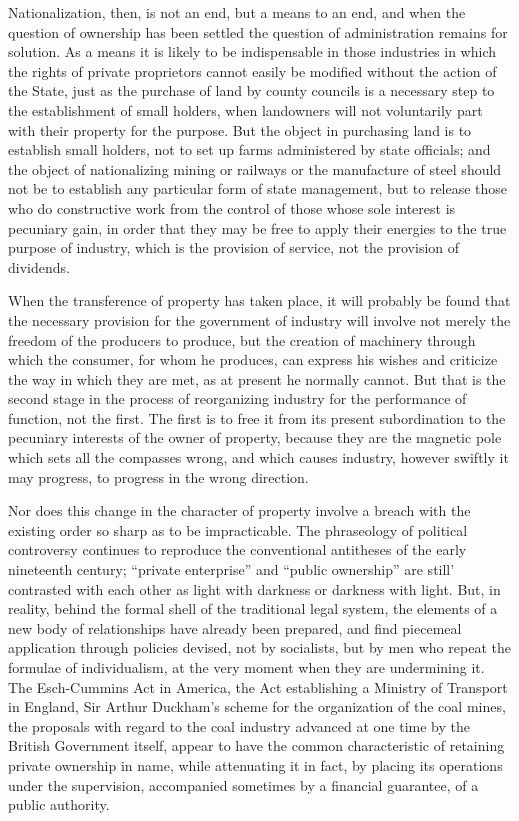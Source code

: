 \documentclass{book}
\begin{document}
Nationalization, then, is not an end, but a means to an end, and when the question of ownership has been settled the question of administration remains for solution. As a means it is likely to be indispensable in those industries in which the rights of private proprietors cannot easily be modified without the action of the State, just as the purchase of land by county councils is a necessary step to the establishment of small holders, when landowners will not voluntarily part with their property for the purpose. But the object in purchasing land is to establish small holders, not to set up farms administered by state officials; and the object of nationalizing mining or railways or the manufacture of steel should not be to establish any particular form of state management, but to release those who do constructive work from the control of those whose sole interest is pecuniary gain, in order that they may be free to apply their energies to the true purpose of industry, which is the provision of service, not the provision of dividends.

When the transference of property has taken place, it will probably be found that the necessary provision for the government of industry will involve not merely the freedom of the producers to produce, but the creation of machinery through which the consumer, for whom he produces, can express his wishes and criticize the way in which they are met, as at present he normally cannot. But that is the second stage in the process of reorganizing industry for the performance of function, not the first. The first is to free it from its present subordination to the pecuniary interests of the owner of property, because they are the magnetic pole which sets all the compasses wrong, and which causes industry, however swiftly it may progress, to progress in the wrong direction.

Nor does this change in the character of property involve a breach with the existing order so sharp as to be impracticable. The phraseology of political controversy continues to reproduce the conventional antitheses of the early nineteenth century; “private enterprise” and “public ownership” are still’ contrasted with each other as light with darkness or darkness with light. But, in reality, behind the formal shell of the traditional legal system, the elements of a new body of relationships have already been prepared, and find piecemeal application through policies devised, not by socialists, but by men who repeat the formulae of individualism, at the very moment when they are undermining it. The Esch-Cummins Act in America, the Act establishing a Ministry of Transport in England, Sir Arthur Duckham’s scheme for the organization of the coal mines, the proposals with regard to the coal industry advanced at one time by the British Government itself, appear to have the common characteristic of retaining private ownership in name, while attenuating it in fact, by placing its operations under the supervision, accompanied sometimes by a financial guarantee, of a public authority.
\end{document}
